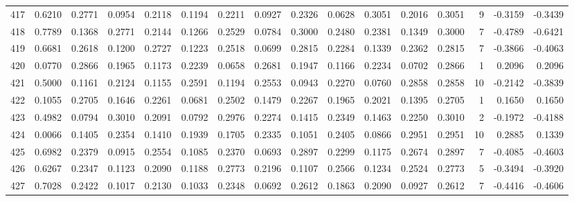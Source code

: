 \begin{tabular}{lrrrrrrrrrrrrrrr}
417 &      0.6210 &  0.2771 &  0.0954 &  0.2118 &  0.1194 &  0.2211 &  0.0927 &  0.2326 &  0.0628 &  0.3051 &   0.2016 &     0.3051 &      9 &                   -0.3159 &                    -0.3439 \\
418 &      0.7789 &  0.1368 &  0.2771 &  0.2144 &  0.1266 &  0.2529 &  0.0784 &  0.3000 &  0.2480 &  0.2381 &   0.1349 &     0.3000 &      7 &                   -0.4789 &                    -0.6421 \\
419 &      0.6681 &  0.2618 &  0.1200 &  0.2727 &  0.1223 &  0.2518 &  0.0699 &  0.2815 &  0.2284 &  0.1339 &   0.2362 &     0.2815 &      7 &                   -0.3866 &                    -0.4063 \\
420 &      0.0770 &  0.2866 &  0.1965 &  0.1173 &  0.2239 &  0.0658 &  0.2681 &  0.1947 &  0.1166 &  0.2234 &   0.0702 &     0.2866 &      1 &                    0.2096 &                     0.2096 \\
421 &      0.5000 &  0.1161 &  0.2124 &  0.1155 &  0.2591 &  0.1194 &  0.2553 &  0.0943 &  0.2270 &  0.0760 &   0.2858 &     0.2858 &     10 &                   -0.2142 &                    -0.3839 \\
422 &      0.1055 &  0.2705 &  0.1646 &  0.2261 &  0.0681 &  0.2502 &  0.1479 &  0.2267 &  0.1965 &  0.2021 &   0.1395 &     0.2705 &      1 &                    0.1650 &                     0.1650 \\
423 &      0.4982 &  0.0794 &  0.3010 &  0.2091 &  0.0792 &  0.2976 &  0.2274 &  0.1415 &  0.2349 &  0.1463 &   0.2250 &     0.3010 &      2 &                   -0.1972 &                    -0.4188 \\
424 &      0.0066 &  0.1405 &  0.2354 &  0.1410 &  0.1939 &  0.1705 &  0.2335 &  0.1051 &  0.2405 &  0.0866 &   0.2951 &     0.2951 &     10 &                    0.2885 &                     0.1339 \\
425 &      0.6982 &  0.2379 &  0.0915 &  0.2554 &  0.1085 &  0.2370 &  0.0693 &  0.2897 &  0.2299 &  0.1175 &   0.2674 &     0.2897 &      7 &                   -0.4085 &                    -0.4603 \\
426 &      0.6267 &  0.2347 &  0.1123 &  0.2090 &  0.1188 &  0.2773 &  0.2196 &  0.1107 &  0.2566 &  0.1234 &   0.2524 &     0.2773 &      5 &                   -0.3494 &                    -0.3920 \\
427 &      0.7028 &  0.2422 &  0.1017 &  0.2130 &  0.1033 &  0.2348 &  0.0692 &  0.2612 &  0.1863 &  0.2090 &   0.0927 &     0.2612 &      7 &                   -0.4416 &                    -0.4606 \\

\end{tabular}
